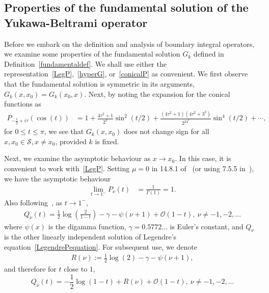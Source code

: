 \documentclass[final]{siamltex}
\renewcommand{\S} {\mathcal{S}}
\newcommand{\bigO} {\mathcal{O}}
\begin{document}
\subsection{Properties of the fundamental solution of the Yukawa-Beltrami operator}
Before we embark on the definition and analysis of boundary integral
operators, we examine some properties of the fundamental solution $G_k$
defined in Definition~\ref{fundamentaldef}. We shall use either the
representation~\eqref{LegP},~\eqref{hyperG}, or~\eqref{conicalP} as
convenient.  We first observe that the fundamental solution is
symmetric in its arguments, $G_k(x,x_{0}) = G_k(x_{0},x)$. Next, by
noting the expansion for the conical functions as~\cite{lebedev}
\begin{align*}
  P_{-\frac{1}{2}+i \tau} (\cos(t)) &= 1+
    \frac{4\tau^2+1}{2^2}\sin^2(t/2) + 
      \frac{(4\tau^2+1)(4\tau^2+3^2)}{2^24^2}\sin^4(t/2) + 
    \cdots,
\end{align*}
for $0\leq t\leq \pi$, we see that $G_k(x,x_0)$ does not change sign for
all $x,x_{0} \in \S, x \neq x_{0}$, provided $k$ is fixed.

Next, we examine the asymptotic behaviour as $x\rightarrow x_0$. In this
case, it is convenient to work with~\eqref{LegP}. Setting $\mu=0$ in
14.8.1 of~\cite{fatAbramowitz} (or using 7.5.5 in~\cite{lebedev}), we have the asymptotic behaviour
\begin{align} 
  \label{Pasymptotics}
  \lim_{t\rightarrow 1^- } P_\nu(t)&= \frac{1}{\Gamma(1)}=1.
\end{align}
Also following~\cite{fatAbramowitz}, as $t\rightarrow 1^{-}$,
\begin{align*}
  Q_{\nu}(t)=\frac{1}{2}\log\left(\frac{2}{1-t}\right)-\gamma
  -\psi(\nu+1)+\bigO(1-t),\: \nu \neq -1,-2,...
\end{align*} 
where $\psi(x)$ is the digamma function, $\gamma=0.5772\ldots$ is
Euler's constant, and $Q_{\nu}$ is the other linearly independent
solution of Legendre's equation~\eqref{LegendrePequation}.  For
subsequent use, we denote 
\begin{align*}
  R(\nu):= \frac{1}{2}\log(2) -\gamma -\psi(\nu+1), 
\end{align*}
and therefore for $t$ close to $1$,
\begin{equation}
  \label{Qasymptotics}
  Q_{\nu}(t)=-\frac{1}{2}\log(1-t) + 
  R(\nu) + \bigO(1-t),\: \nu \neq -1,-2,... 
\end{equation}
\end{document}
